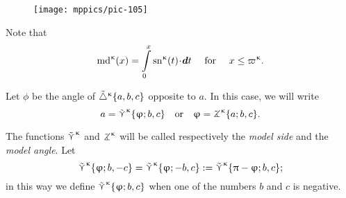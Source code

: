 {

\begin{wrapfigure}{r}{44mm}
\centering
\texttt{[image: mppics/pic-105]}
\end{wrapfigure}

Note that
\[
\mdk(x)=\int\limits_0^x
\snk(t)\cdot\dd t \quad \text{ for }\quad x\le \varpi\kappa.
\]

Let $\phi$ be the angle of ${\tilde\triangle}^{\upkappa}\{a,b,c\}$ 
opposite to $a$.
In this case, we will write \label{page:model-side}%
%
\[a
=
\side\kappa\{\phi;b,c\}
\quad \text{or}\quad 
\phi
=
\tangle\mc\kappa\{a;b,c\}.\]

}

The functions $\mathop{\tilde\curlyvee}\nolimits^{\upkappa}$ and $\tangle\mc\kappa$ will be called respectively the \emph{model side} and the \emph{model angle}.
Let 
\[
\mathop{\tilde\curlyvee}\nolimits^{\upkappa}\{\upvarphi;b,-c\}
=\mathop{\tilde\curlyvee}\nolimits^{\upkappa}\{\upvarphi;-b,c\}
:=\mathop{\tilde\curlyvee}\nolimits^{\upkappa}\{\uppi-\upvarphi;b,c\};\]
in this way we define $\mathop{\tilde\curlyvee}\nolimits^{\upkappa}\{\upvarphi;b,c\}$ when one of the numbers $b$ and $c$ is negative. %

\pagebreak%

